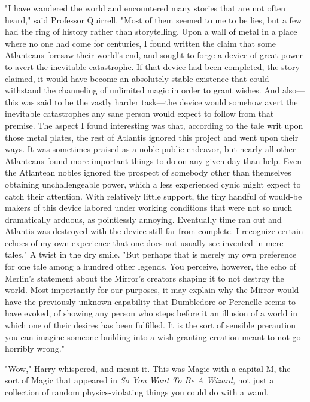 "I have wandered the world and encountered many stories that are not often
heard," said Professor Quirrell. "Most of them seemed to me to be lies, but a
few had the ring of history rather than storytelling. Upon a wall of metal in a
place where no one had come for centuries, I found written the claim that some
Atlanteans foresaw their world's end, and sought to forge a device of great
power to avert the inevitable catastrophe. If that device had been completed,
the story claimed, it would have become an absolutely stable existence that
could withstand the channeling of unlimited magic in order to grant wishes. And
also---this was said to be the vastly harder task---the device would somehow
avert the inevitable catastrophes any sane person would expect to follow from
that premise. The aspect I found interesting was that, according to the tale
writ upon those metal plates, the rest of Atlantis ignored this project and
went upon their ways. It was sometimes praised as a noble public endeavor, but
nearly all other Atlanteans found more important things to do on any given day
than help. Even the Atlantean nobles ignored the prospect of somebody other
than themselves obtaining unchallengeable power, which a less experienced cynic
might expect to catch their attention. With relatively little support, the tiny
handful of would-be makers of this device labored under working conditions that
were not so much dramatically arduous, as pointlessly annoying. Eventually time
ran out and Atlantis was destroyed with the device still far from complete. I
recognize certain echoes of my own experience that one does not usually see
invented in mere tales." A twist in the dry smile. "But perhaps that is merely
my own preference for one tale among a hundred other legends. You perceive,
however, the echo of Merlin's statement about the Mirror's creators shaping it
to not destroy the world. Most importantly for our purposes, it may explain why
the Mirror would have the previously unknown capability that Dumbledore or
Perenelle seems to have evoked, of showing any person who steps before it an
illusion of a world in which one of their desires has been fulfilled. It is the
sort of sensible precaution you can imagine someone building into a
wish-granting creation meant to not go horribly wrong."

"Wow," Harry whispered, and meant it. This was Magic with a capital M, the sort
of Magic that appeared in \emph{So You Want To Be A Wizard,} not just a
collection of random physics-violating things you could do with a wand.

